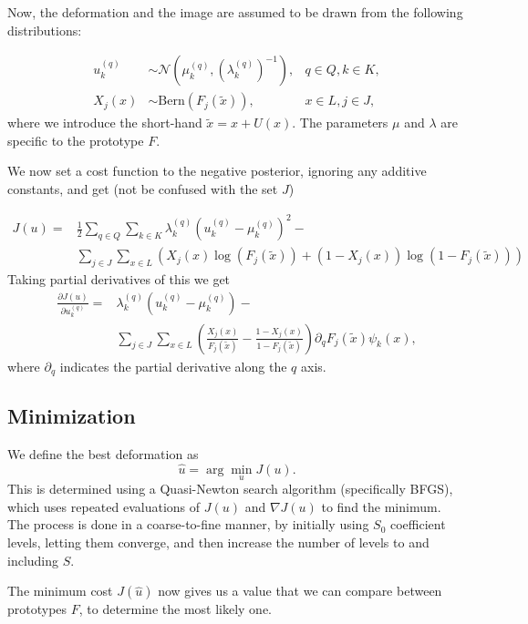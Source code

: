 \documentclass{article}
\begin{document}
Now, the deformation and the image are assumed to be drawn from the following distributions:

\begin{align}
    u^{(q)}_{k} &\sim \mathcal{N}(\mu^{(q)}_{k}, (\lambda^{(q)}_{k})^{-1}), &q \in Q, k \in K, \label{eq:gaussian} \\
    X_j(x) &\sim \text{Bern}(F_j(\tilde x)), &x \in L, j \in J, \label{eq:bernoulli}
 \end{align}
where we introduce the short-hand $\tilde x = x + U(x)$. The parameters $\mu$ and $\lambda$ are specific to the prototype $F$.

We now set a cost function to the negative posterior, ignoring any additive constants, and get (not be confused with the set $J$)

\begin{align*}
    J(u) =& \frac{1}{2} \sum_{q\in Q} \sum_{k\in K} \lambda^{(q)}_k (u^{(q)}_k -\mu^{(q)}_k)^2 - \\
        &\sum_{j\in J} \sum_{x \in L}  \left( 
            X_j(x) \log(F_j(\tilde x))   +   (1-X_j(x)) \log(1-F_j(\tilde x)) \right)
\end{align*}
Taking partial derivatives of this we get
\begin{align*}
    \frac{\partial J(u)}{\partial u^{(q)}_k} =& \lambda^{(q)}_k (u^{(q)}_k -\mu^{(q)}_k) - \\    
    & \sum_{j\in J} \sum_{x \in L} 
        \left( \frac{X_j(x)}{F_j(\tilde x)} - \frac{1-X_j(x)}{1-F_j(\tilde x)} \right) 
                \partial_q F_j(\tilde x) \psi_k(x),
\end{align*} 
where $\partial_q$ indicates the partial derivative along the $q$ axis.

\subsection{Minimization}

We define the best deformation as
\[
    \hat u = \arg\min_u J(u).
\]
This is determined using a Quasi-Newton search algorithm (specifically BFGS), which uses repeated evaluations of $J(u)$ and $\nabla J(u)$ to find the minimum. The process is done in a coarse-to-fine manner, by initially using $S_0$ coefficient levels, letting them converge, and then increase the number of levels to and including $S$.

The minimum cost $J(\hat u)$ now gives us a value that we can compare between prototypes $F$, to determine the most likely one. 
\end{document}

